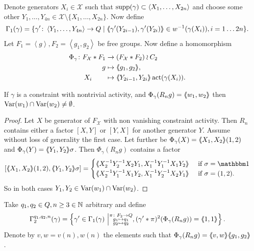 \documentclass[a4paper,11pt]{amsart}
\begin{document}
 Denote generators $X_i\in\mathcal{X}$ such that $\operatorname{{supp}}(\gamma) \subset \left<X_1,\dotsc,X_{2n}\right>$ and choose some 
 other $Y_1,\dotsc,Y_{4n} \in\mathcal{X} \setminus \{X_1,\dotsc,X_{2n}\}$. 
 Now define
 \[\Gamma_1(\gamma) = \{\gamma' \colon \left< Y_1,\ldots ,Y_{4n}\right> \to Q \mid \langle\negthickspace\langle\gamma'(Y_{2i-1}),\gamma'(Y_{2i})\rangle\negthickspace\rangle\in w^{-1}(\gamma(X_i)),i=1\ldots2n\}.\] 
 Let $F_1=\left<g\right>,F_2=\left<g_1,g_2\right>$ be free groups. 
 Now define a homomorphism  
 \begin{align*}
  \Phi_{\gamma}\colon F_{\mathcal{X}}*F_1 &\to (F_{\mathcal{X}}*F_2)\wr C_2 \\ g&\mapsto \langle\negthickspace\langle g_1,g_2\rangle\negthickspace\rangle,\\ X_i\qquad &\mapsto \langle\negthickspace\langle Y_{2i-1},Y_{2i}\rangle\negthickspace\rangle\operatorname{act}(\gamma(X_i)).
 \end{align*}
\begin{lem} \label{lem:commonVar}
 If $\gamma$ is a constraint with nontrivial activity, and $\Phi_\gamma(R_ng)=\langle\negthickspace\langle w_1,w_2\rangle\negthickspace\rangle$ then $\textup{Var}(w_1)\cap\textup{Var}(w_2)\neq \emptyset$.
\end{lem}
\begin{proof}
 Let $X$ be generator of $F_{\mathcal{X}}$ with non vanishing constraint activity. 
 Then $R_n$ contains either a factor $[X,Y]$ or $[Y,X]$ for another generator $Y$. Assume without loss of generality the first case.
 Let further be $\Phi_\gamma(X)=\langle\negthickspace\langle X_1,X_2\rangle\negthickspace\rangle(1,2)$ and $\Phi_\gamma(Y)=\langle\negthickspace\langle Y_1,Y_2\rangle\negthickspace\rangle\sigma$. 
 Then $\Phi_\gamma(R_n g)$ contains a factor 
 \[ [\pair{X_1,X_2}(1,2),\pair{Y_1,Y_2}\sigma] = \begin{cases}
                                                   \pair{X_2^{-1}Y_2^{-1}X_2Y_1,X_1^{-1}Y_1^{-1}X_1Y_2} & \textup{ if } \sigma=\id \\
                                                   \pair{X_2^{-1}Y_1^{-1}X_1Y_2,X_1^{-1}Y_2^{-1}X_2Y_1} & \textup{ if } \sigma=(1,2) . \\
                                                 \end{cases}
\] So in both cases $Y_1,Y_2\in \textup{Var}(w_1)\cap \textup{Var}(w_2)$. 
\end{proof}
Take $q_1,q_2 \in Q,n\geq3\in \mathbb{N}$ arbitrary and define
 \[\Gamma_2^{q_1,q_2,n}(\gamma) = \left\{\gamma'\in \Gamma_1(\gamma) \ \middle \vert \substack{\pi\colon F_2\to Q\\
										g_1\mapsto q_1 \\
										g_2\mapsto q_2 }, (\gamma'*\pi)^2(\Phi_\gamma(R_ng))=\langle\negthickspace\langle1,1\rangle\negthickspace\rangle\right\}.\] 
 Denote by $v,w=v(n),w(n)$ the elements such that $\Phi_\gamma(R_ng)=\langle\negthickspace\langle v,w\rangle\negthickspace\rangle\langle\negthickspace\langle g_1,g_2\rangle\negthickspace\rangle$.
\end{document}
